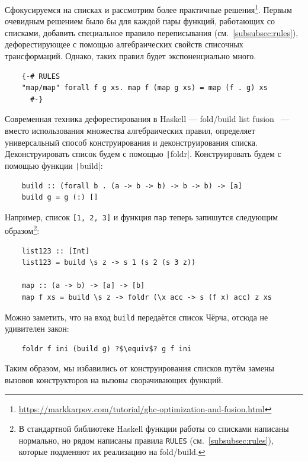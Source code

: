 Сфокусируемся на списках и рассмотрим более практичные решения\footnote{\url{https://markkarpov.com/tutorial/ghc-optimization-and-fusion.html}}.
Первым очевидным решением было бы для каждой пары функций, работающих со списками, добавить специальное правило переписывания (см.~\ref{subsubsec:rules}), дефорестирующее с помощью алгебраических свойств списочных трансформаций.
Однако, таких правил будет экспоненциально много.
\begin{verbatim}
    {-# RULES
    "map/map" forall f g xs. map f (map g xs) = map (f . g) xs
      #-}
\end{verbatim}

Современная техника дефорестирования в Haskell --- fold/build list fusion~\cite{gill1993short} --- вместо использования множества алгебраических правил, определяет универсальный способ конструирования и деконструирования списка.
Деконструировать список будем с помощью \texttt|foldr|.
Конструировать будем с помощью функции \texttt|build|:
\begin{verbatim}
    build :: (forall b . (a -> b -> b) -> b -> b) -> [a]
    build g = g (:) []
\end{verbatim}
Например, список \texttt{[1, 2, 3]} и функция \texttt{map} теперь запишутся следующим образом\footnote{В стандартной библиотеке Haskell функции работы со списками написаны нормально, но рядом написаны правила \texttt{RULES} (см.~\ref{subsubsec:rules}), которые подменяют их реализацию на fold/build.}:
\begin{verbatim}
    list123 :: [Int]
    list123 = build \s z -> s 1 (s 2 (s 3 z))

    map :: (a -> b) -> [a] -> [b]
    map f xs = build \s z -> foldr (\x acc -> s (f x) acc) z xs
\end{verbatim}
Можно заметить, что на вход \texttt{build} передаётся список Чёрча, отсюда не удивителен закон:
\begin{verbatim}
    foldr f ini (build g) ?$\equiv$? g f ini
\end{verbatim}

Таким образом, мы избавились от конструирования списков путём замены вызовов конструкторов на вызовы сворачивающих функций.

